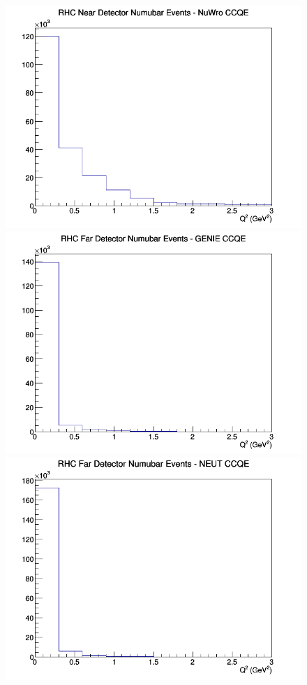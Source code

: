 \documentclass[12pt]{article}
\begin{document}
\begin{figure}[h]
\includegraphics[width=\linewidth]{eff_Q2/FGT/CCQE_RHC_ND_numubar_Q2_NuWro.png}
\endminipage
\newline
{}
\includegraphics[width=\linewidth]{eff_Q2/FGT/CCQE_RHC_FD_numubar_Q2_GENIE.png}
\endminipage
{}
\includegraphics[width=\linewidth]{eff_Q2/FGT/CCQE_RHC_FD_numubar_Q2_NEUT.png}

\end{figure}
\end{document}
